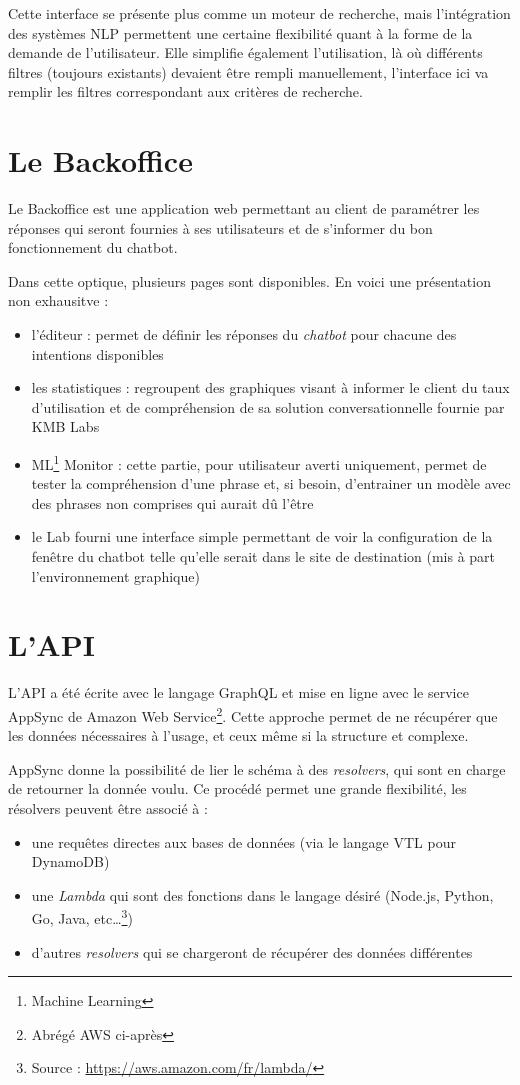 \documentclass[12pt,a4paper,oneside]{scrreprt}
\begin{document}
Cette interface se présente plus comme un moteur de recherche, mais l'intégration des systèmes NLP permettent une certaine flexibilité quant à la forme de la demande de l'utilisateur. Elle simplifie également l'utilisation, là où différents filtres (toujours existants) devaient être rempli manuellement, l'interface ici va remplir les filtres correspondant aux critères de recherche.

\section{Le Backoffice}

Le Backoffice est une application web permettant au client de paramétrer les réponses qui seront fournies à ses utilisateurs et de s'informer du bon fonctionnement du chatbot.

Dans cette optique, plusieurs pages sont disponibles. En voici une présentation non exhausitve :
\begin{itemize}
\item l'éditeur : permet de définir les réponses du \textit{chatbot} pour chacune des intentions disponibles
\item les statistiques : regroupent des graphiques visant à informer le client du taux d'utilisation et de compréhension de sa solution conversationnelle fournie par KMB Labs
\item ML\footnote{Machine Learning} Monitor : cette partie, pour utilisateur averti uniquement, permet de tester la compréhension d'une phrase et, si besoin, d'entrainer un modèle avec des phrases non comprises qui aurait dû l'être
\item le Lab fourni une interface simple permettant de voir la configuration de la fenêtre du chatbot telle qu'elle serait dans le site de destination (mis à part l'environnement graphique)
\end{itemize}

\section{L'API}

L'API a été écrite avec le langage GraphQL et mise en ligne avec le service AppSync de Amazon Web Service\footnote{Abrégé \og AWS\fg{} ci-après}. Cette approche permet de ne récupérer que les données nécessaires  à l'usage, et ceux même si la structure et complexe.

AppSync donne la possibilité de lier le schéma à des \textit{resolvers}, qui sont en charge de retourner la donnée voulu. Ce procédé permet une grande flexibilité, les résolvers peuvent être associé à :
\begin{itemize}
	\item une requêtes directes aux bases de données (via le langage VTL pour DynamoDB)
	\item une \textit{Lambda} qui sont des fonctions dans le langage désiré (Node.js, Python, Go, Java, etc\dots\footnote{Source : \url{https://aws.amazon.com/fr/lambda/}})
	\item d'autres \textit{resolvers} qui se chargeront de récupérer des données différentes
\end{itemize}
\end{document}
